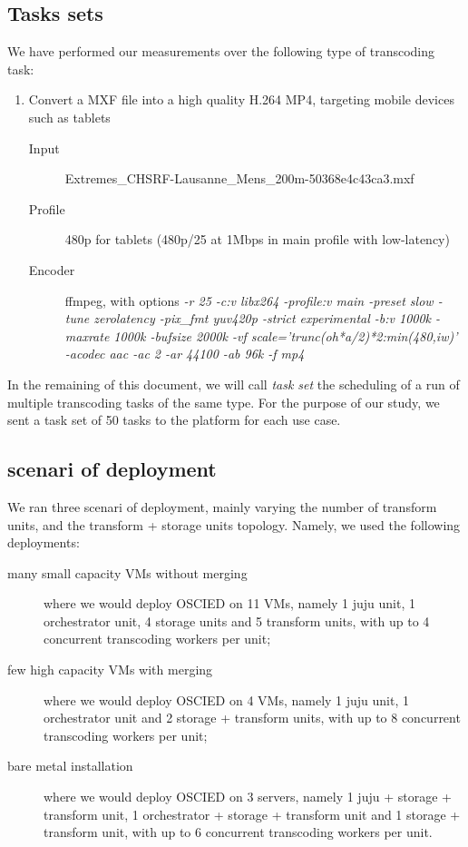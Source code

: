 \documentclass[a4paper, titlepage]{paper}
\numberwithin{figure}{section}
\numberwithin{table}{section}
\begin{document}
    \subsection{Tasks sets}
      We have performed our measurements over the following type of transcoding task:
      \begin{enumerate}
        \item Convert a MXF file into a high quality H.264 MP4, targeting mobile devices such as tablets
        \begin{description}
            \item[Input] Extremes\_CHSRF-Lausanne\_Mens\_200m-50368e4c43ca3.mxf
            \item[Profile] 480p for tablets (480p/25 at 1Mbps in main
profile with low-latency)
            \item[Encoder] ffmpeg, with options \emph{-r 25 -c:v libx264 -profile:v main -preset slow -tune zerolatency -pix\_fmt yuv420p -strict experimental -b:v 1000k - maxrate 1000k -bufsize 2000k -vf scale='trunc(oh*a/2)*2:min(480,iw)' -acodec aac -ac 2 -ar 44100 -ab 96k -f mp4}
        \end{description}
      \end{enumerate}

      In the remaining of this document, we will call \emph{task set} the scheduling of a run of multiple transcoding tasks of the same type. For the purpose of our study, we sent a task set of 50 tasks to the platform for each use case.

    \subsection{scenari of deployment}
      We ran three scenari of deployment, mainly varying the number of transform units, and the transform + storage units topology. Namely, we used the following deployments:

      \begin{description}
          \item[many small capacity VMs without merging] where we would deploy OSCIED on 11 VMs, namely 1 juju unit, 1 orchestrator unit, 4 storage units and 5 transform units, with up to 4 concurrent transcoding workers per unit;
          \item[few high capacity VMs with merging] where we would deploy OSCIED on 4 VMs, namely 1 juju unit, 1 orchestrator unit and 2 storage + transform units, with up to 8 concurrent transcoding workers per unit;
          \item[bare metal installation] where we would deploy OSCIED on 3 servers, namely 1 juju + storage + transform unit, 1 orchestrator + storage + transform unit and 1 storage + transform unit, with up to 6 concurrent transcoding workers per unit.
      \end{description}
\end{document}
